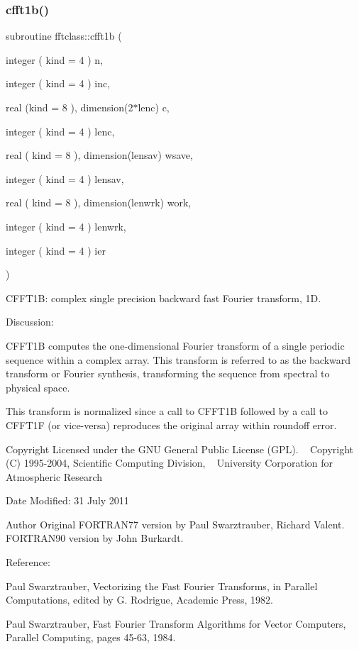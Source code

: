 \subsubsection{\texorpdfstring{cfft1b()}{cfft1b()}}
{\footnotesize\ttfamily subroutine fftclass\+::cfft1b (\begin{DoxyParamCaption}\item[{integer ( kind = 4 )}]{n,  }\item[{integer ( kind = 4 )}]{inc,  }\item[{real (kind = 8 ), dimension(2$\ast$lenc)}]{c,  }\item[{integer ( kind = 4 )}]{lenc,  }\item[{real ( kind = 8 ), dimension(lensav)}]{wsave,  }\item[{integer ( kind = 4 )}]{lensav,  }\item[{real ( kind = 8 ), dimension(lenwrk)}]{work,  }\item[{integer ( kind = 4 )}]{lenwrk,  }\item[{integer ( kind = 4 )}]{ier }\end{DoxyParamCaption})}



C\+F\+F\+T1B\+: complex single precision backward fast Fourier transform, 1D. 

\begin{DoxyVerb}  Discussion:
 
    CFFT1B computes the one-dimensional Fourier transform of a single 
    periodic sequence within a complex array.  This transform is referred 
    to as the backward transform or Fourier synthesis, transforming the
    sequence from spectral to physical space.

    This transform is normalized since a call to CFFT1B followed
    by a call to CFFT1F (or vice-versa) reproduces the original
    array within roundoff error.\end{DoxyVerb}
 \begin{DoxyCopyright}{Copyright}
Licensed under the G\+NU General Public License (G\+PL). ~\newline
 Copyright (C) 1995-\/2004, Scientific Computing Division, ~\newline
 University Corporation for Atmospheric Research 
\end{DoxyCopyright}
\begin{DoxyDate}{Date}
Modified\+: 31 July 2011 
\end{DoxyDate}
\begin{DoxyAuthor}{Author}
Original F\+O\+R\+T\+R\+A\+N77 version by Paul Swarztrauber, Richard Valent. ~\newline
 F\+O\+R\+T\+R\+A\+N90 version by John Burkardt.
\end{DoxyAuthor}
\begin{DoxyVerb}  Reference:

    Paul Swarztrauber,
    Vectorizing the Fast Fourier Transforms,
    in Parallel Computations,
    edited by G. Rodrigue,
    Academic Press, 1982.

    Paul Swarztrauber,
    Fast Fourier Transform Algorithms for Vector Computers,
    Parallel Computing, pages 45-63, 1984.\end{DoxyVerb}
 
